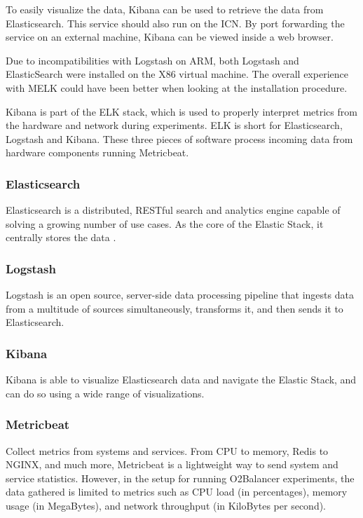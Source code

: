 \documentclass[]{article}
\begin{document}
To easily visualize the data, Kibana can be used to retrieve the data from Elasticsearch. This service should also run on the ICN. By port forwarding the service on an external machine, Kibana can be viewed inside a web browser.

Due to incompatibilities with Logstash on ARM, both Logstash and ElasticSearch were installed on the X86 virtual machine. The overall experience with MELK could have been better when looking at the installation procedure.

Kibana is part of the ELK stack, which is used to properly interpret metrics from the hardware and network during experiments. ELK is short for Elasticsearch, Logstash and Kibana. These three pieces of software process incoming data from hardware components running Metricbeat.

\subsubsection{Elasticsearch}
Elasticsearch is a distributed, RESTful search and analytics engine capable of solving a growing number of use cases. As the core of the Elastic Stack, it centrally stores the data \cite{melk_2019}.

\subsubsection{Logstash}
Logstash is an open source, server-side data processing pipeline that ingests data from a multitude of sources simultaneously, transforms it, and then sends it to Elasticsearch.

\subsubsection{Kibana}
Kibana is able to visualize Elasticsearch data and navigate the Elastic Stack, and can do so using a wide range of visualizations.

\subsubsection{Metricbeat}
Collect metrics from systems and services. From CPU to memory, Redis to NGINX, and much more, Metricbeat is a lightweight way to send system and service statistics. However, in the setup for running O2Balancer experiments, the data gathered is limited to metrics such as CPU load (in percentages), memory usage (in MegaBytes), and network throughput (in KiloBytes per second).
\end{document}
